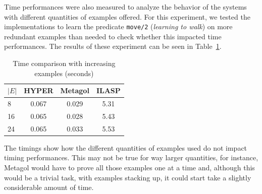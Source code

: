 Time performances were also measured to analyze the behavior of the systems with different quantities of examples offered.
For this experiment, we tested the implementations to learn the predicate \texttt{move/2} (\emph{learning to walk}) on more redundant examples than needed to check
whether this impacted time performances. The results of these experiment can be seen in Table~\ref{tab:ex_cmp}.

{
\begin{center}
    \begin{table}[h]
    \centering
    \begin{tabular}{ |l|c|c|c| } 
        \hline
        \(|E|\) & \textbf{HYPER} & \textbf{Metagol} & \textbf{ILASP} \\ \hline
        8 & 0.067 & 0.029 & 5.31 \\ 
        16 & 0.065 & 0.028 & 5.43 \\
        24 & 0.065 & 0.033 & 5.53 \\  
        \hline
    \end{tabular}
    \caption{\label{tab:ex_cmp}Time comparison with increasing examples (seconds)}
\end{table}
\end{center}
}
The timings show how the different quantities of examples used do not impact timing performances. This may not be true for way larger
quantities, for instance, Metagol would have to prove all those examples one at a time and, although this would be a trivial task,
with examples stacking up, it could start take a slightly considerable amount of time.


